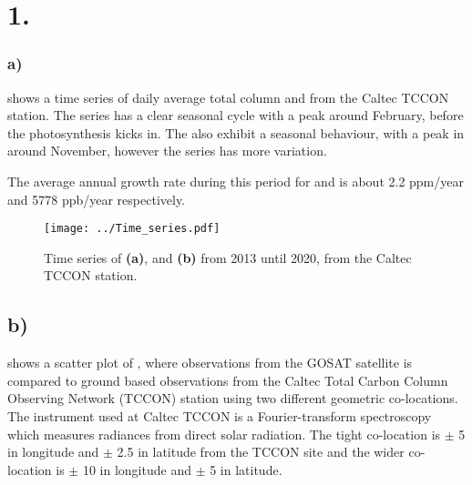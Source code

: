 \section*{1.}

\subsubsection*{a)}  shows a time series of
daily average total column  and  from the Caltec TCCON station.
The  series has a 
clear seasonal cycle with a peak around February, before the photosynthesis
kicks in. The  also exhibit a
seasonal behaviour, with a peak in  around November, however the
 series has more variation. 

The average annual growth rate during this period for  and  is
about 2.2 ppm/year and 5778 ppb/year respectively.  
 
\begin{figure}[htbp]
    \texttt{[image: ../Time\_series.pdf]}
    \centering
    \caption{Time series of  \textbf{(a)}, and  \textbf{(b)} from 2013 until 2020, from the Caltec TCCON station.}
    \label{fig:Time_series_XCH4_XCO2}

\end{figure}

\subsection*{b)}
 shows a scatter plot of , where observations
from the GOSAT satellite is compared to ground based observations from
the Caltec Total Carbon Column Observing Network (TCCON) station using two
different geometric co-locations. The instrument used at Caltec TCCON is a
Fourier-transform spectroscopy which measures radiances from direct
solar radiation. The tight co-location is $\pm$ 5 \degree in
longitude and $\pm$ 2.5 \degree in latitude from the TCCON site and the wider
co-location is $\pm$ 10 \degree in longitude and $\pm$
5 \degree in latitude.

